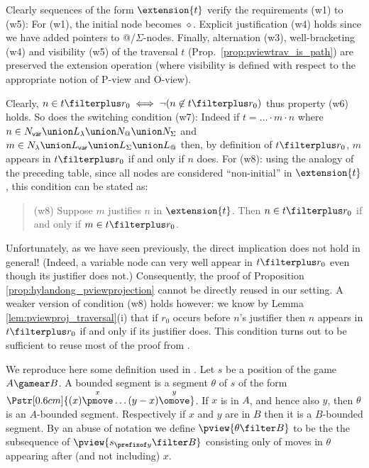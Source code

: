 Clearly sequences of the form $\extension{t}$ verify the requirements (w1) to (w5): For (w1), the initial node
becomes $\diamond$. Explicit justification (w4) holds since we have added pointers to @/$\Sigma$-nodes.
Finally, alternation (w3), well-bracketing (w4) and visibility (w5) of the traversal $t$ (Prop.\
\ref{prop:pviewtrav_is_path}) are preserved the extension operation
(where visibility is defined with respect to the appropriate
notion of P-view and O-view).

Clearly, $n \in t\filterplus r_0 \iff \neg ( n \not\in t\filterplus
r_0)$ thus property (w6) holds. So does the switching condition
(w7): Indeed if $t = \ldots \cdot m \cdot n$ where $n\in N_{\sf
var} \union L_\lambda \union N_@ \union N_\Sigma$ and $m \in
N_\lambda \union L_{\sf var} \union L_\Sigma \union L_@$ then, by definition of $t\filterplus r_0$, $m$ appears in $t\filterplus r_0$ if and only if $n$ does. For (w8): using the analogy of the preceding table, since all nodes are considered ``non-initial'' in
$\extension{t}$, this condition can be stated as:
\begin{quote}
 (w8) Suppose $m$ justifies $n$ in $\extension{t}$. Then $n \in t\filterplus r_0$ if and only if $m\in t\filterplus r_0$.
\end{quote}
Unfortunately, as we have seen previously, the direct implication
does not hold in general! (Indeed, a variable node can very well
appear in $t\filterplus r_0$ even though its justifier does not.)
Consequently, the proof of Proposition
\ref{prop:hylandong_pviewprojection} cannot be directly reused in
our setting. A weaker version of condition (w8) holds however: we
know by Lemma \ref{lem:pviewproj_traversal}(i) that if $r_0$
occurs before $n$'s justifier then $n$ appears in $t\filterplus r_0$
if and only if its justifier does. This condition turns out to be
sufficient to reuse most of the proof from \cite{hylandong_pcf}.

We reproduce here some definition used in \cite{hylandong_pcf}. Let
$s$ be a position of the game $A\gamear B$. A bounded segment is
a segment $\theta$ of $s$ of the form
$\Pstr[0.6cm]{(x){\stackrel{x}\pmove} \ldots
(y-x){\stackrel{y}\omove}}$. If $x$ is in $A$, and hence also $y$,
then $\theta$ is an $A$-bounded segment. Respectively if $x$ and $y$
are in $B$ then it is a $B$-bounded segment. By an abuse of notation
we define $\pview{\theta \filter B}$ to be the the subsequence of
$\pview{s_{\prefixof y} \filter B}$ consisting only of moves in
$\theta$ appearing after (and not including) $x$.

